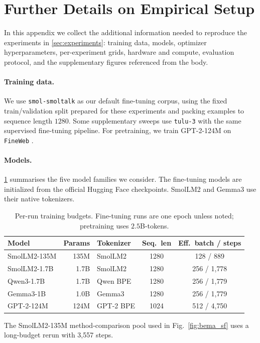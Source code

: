 \section{Further Details on Empirical Setup}
\label{sec:exp-details}

In this appendix we collect the additional information needed to reproduce the experiments in \cref{sec:experiments}: training data, models, optimizer hyperparameters, per-experiment grids, hardware and compute, evaluation protocol, and the supplementary figures referenced from the body.

\paragraph{Training data.} We use \texttt{smol-smoltalk} \citep{smoltalk} as our default fine-tuning corpus, using the fixed train/validation split prepared for these experiments and packing examples to sequence length $1280$. Some supplementary sweeps use \texttt{tulu-3} \citep{lambert2024tulu} with the same supervised fine-tuning pipeline. For pretraining, we train GPT-2-124M on \texttt{FineWeb} \citep{penedo2024fineweb}.

\paragraph{Models.} \cref{tab:models} summarises the five model families we consider. The fine-tuning models are initialized from the official Hugging Face checkpoints. SmolLM2 and Gemma3 use their native tokenizers.

\begin{table}[t]
\centering
\caption{Per-run training budgets. Fine-tuning runs are one epoch unless noted; pretraining uses $2.5$B-tokens.}
\small
\begin{tabular}{lrlcc}
\toprule
Model & Params & Tokenizer & Seq.\ len & Eff.\ batch / steps \\
\midrule
SmolLM2-135M       & 135M  & SmolLM2          & 1280 & 128 / 889    \\
SmolLM2-1.7B       & 1.7B  & SmolLM2          & 1280 & 256 / 1{,}778 \\
Qwen3-1.7B         & 1.7B  & Qwen BPE         & 1280 & 256 / 1{,}779 \\
Gemma3-1B          & 1.0B  & Gemma3           & 1280 & 256 / 1{,}779 \\
GPT-2-124M         & 124M  & GPT-2 BPE        & 1024 & 512 / 4{,}750 \\
\bottomrule
\end{tabular}

\vspace{2pt}
\footnotesize The SmolLM2-135M method-comparison pool used in Fig.~\ref{fig:bema_sf} uses a long-budget rerun with 3{,}557 steps.

\label{tab:models}
\end{table}

